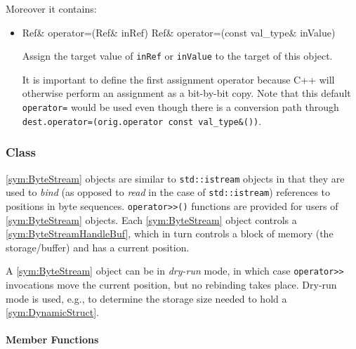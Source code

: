 Moreover it contains:
\begin{itemize}
	\item
		\begin{cppsnippet}
		Ref& operator=(Ref& inRef)
		Ref& operator=(const val_type& inValue)
		\end{cppsnippet}

		Assign the target value of \texttt{inRef} or \texttt{inValue} to the target of this object.

		It is important to define the first assignment operator because C++ will otherwise perform an assignment as a bit-by-bit copy. Note that this default \texttt{operator=} would be used even though there is a conversion path through \texttt{dest.operator=(orig.operator const val\_type\&())}.
\end{itemize}


\subsubsection[Class ByteStream]{Class }

\ref{sym:ByteStream} objects are similar to \texttt{std::istream} objects in that they are used to \emph{bind} (as opposed to \emph{read} in the case of \texttt{std::istream}) references to positions in byte sequences. \texttt{operator>\/>()} functions are provided for users of \ref{sym:ByteStream} objects. Each \ref{sym:ByteStream} object controls a \ref{sym:ByteStreamHandleBuf}, which in turn controls a block of memory (the storage/buffer) and has a current position.

A \ref{sym:ByteStream} object can be in \emph{dry-run} mode, in which case \texttt{operator>\/>} invocations move the current position, but no rebinding takes place. Dry-run mode is used, e.g., to determine the storage size needed to hold a \ref{sym:DynamicStruct}.

\paragraph{Member Functions}

